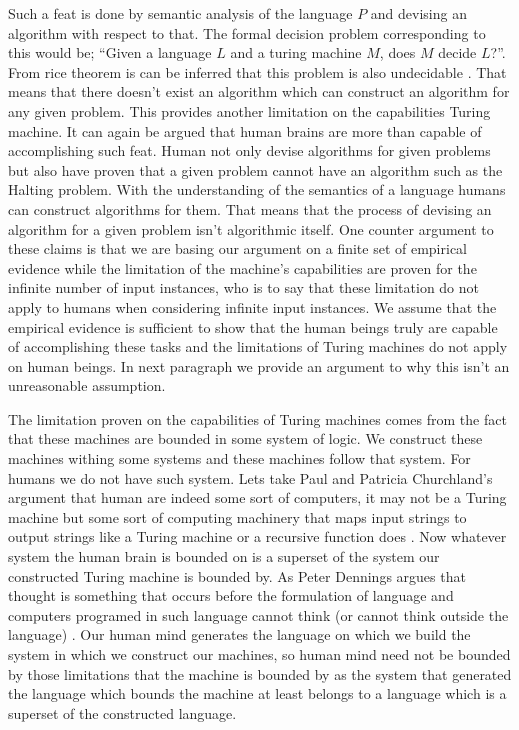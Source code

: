 \documentclass[11pt,a4paper]{article}
\begin{document}
Such a feat is done by semantic analysis of the language $P$ and devising an algorithm with respect to that. The formal decision problem corresponding to this would be; ``Given a language $L$ and a turing machine $M$, does $M$ decide $L$?''. From rice theorem is can be inferred that this problem is also undecidable \cite{Rice53}\cite[,241 ]{sipser13}.
That means that there doesn't exist an algorithm  which can construct an algorithm for any given problem. This provides another limitation on the capabilities Turing machine.
It can again be argued that human brains are more than capable of accomplishing such feat. Human not only devise algorithms for given problems but also have proven that a given problem cannot have an algorithm such as the Halting problem. 
With the understanding of the semantics of a language humans can construct algorithms for them. That means that the process of devising an algorithm for a given problem isn't algorithmic itself.
One counter argument to these claims is that we are basing our argument on a finite set of empirical evidence while the limitation of the machine's capabilities are proven for the infinite number of input instances, who is to say that these limitation do not apply to humans when considering infinite input instances.
We assume that the empirical evidence is sufficient to show that the human beings truly are capable of accomplishing these tasks and the limitations of Turing machines do not apply on human beings.
In next paragraph we provide an argument to why this isn't an unreasonable assumption.
\\\par\vspace*{0.5cm}
The limitation proven on the capabilities of Turing machines comes from the fact that these machines are bounded in some system of logic. We construct these machines withing some systems and these machines follow that system.
For humans we do not have such system. Lets take Paul and Patricia Churchland's argument that human are indeed some sort of computers, it may not be a Turing machine but some sort of computing machinery that maps input strings to output strings like a Turing machine or a recursive function does \cite{Churchland}. 
Now whatever system the human brain is bounded on is a superset of the system our constructed Turing machine is bounded by. As Peter Dennings argues that thought is something that occurs before the formulation of language and computers programed in such language cannot think (or cannot think outside the language) \cite{Denning}.
Our human mind generates the language on which we build the system in which we construct our machines, so human mind need not be bounded by those limitations that the machine is bounded by as the system that generated the language which bounds the machine at least belongs to a language which is a superset of the constructed language.
\end{document}
